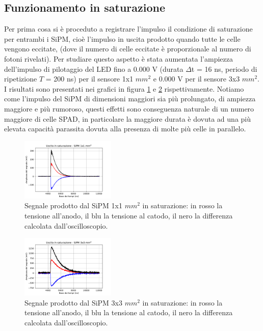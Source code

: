\documentclass[journal]{IEEEtran}
\begin{document}
\subsection{Funzionamento in saturazione}
Per prima cosa si è proceduto a registrare l'impulso il condizione di saturazione per entrambi i SiPM, cioè l'impulso in uscita prodotto quando tutte le celle vengono eccitate, (dove il numero di celle eccitate è proporzionale al numero di fotoni rivelati). Per studiare questo aspetto è stata aumentata l'ampiezza dell'impulso di pilotaggio del LED fino a 0.000 V (durata $\Delta$t = 16 ns, periodo di ripetizione $T$ = 200 ns) per il sensore 1x1 $mm^2$ e 0.000 V per il sensore 3x3 $mm^2$. I risultati sono presentati nei grafici in figura \ref{fig:SiPM_sat_1mm} e \ref{fig:SiPM_sat_3mm} rispettivamente. Notiamo come l'impulso del SiPM di dimensioni maggiori sia più prolungato, di ampiezza maggiore e più rumoroso, questi effetti sono conseguenza naturale di un numero maggiore di celle SPAD, in particolare la maggiore durata è dovuta ad una più elevata capacità parassita dovuta alla presenza di molte più celle in parallelo.


\begin{figure}[H]%
\begin{center}
\includegraphics[width=0.40\textwidth]{analysis/output/SiPM_sat_1mm.pdf}
\caption{Segnale prodotto dal SiPM 1x1 $mm^2$ in saturazione: in rosso la tensione all'anodo, il blu la tensione al catodo, il nero la differenza calcolata dall'oscilloscopio.}
\label{fig:SiPM_sat_1mm}
\end{center}
\end{figure}

\begin{figure}[H]%
\begin{center}
\includegraphics[width=0.40\textwidth]{analysis/output/SiPM_sat_3mm.pdf}
\caption{Segnale prodotto dal SiPM 3x3 $mm^2$ in saturazione: in rosso la tensione all'anodo, il blu la tensione al catodo, il nero la differenza calcolata dall'oscilloscopio.}
\label{fig:SiPM_sat_3mm}
\end{center}
\end{figure}
\end{document}
